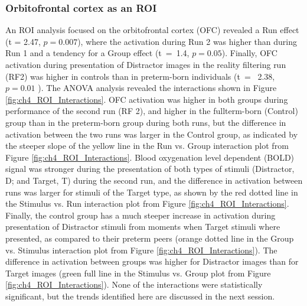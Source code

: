 \vspace{1cm}
\subsubsection{Orbitofrontal cortex as an ROI}
An ROI analysis focused on the orbitofrontal cortex (OFC) revealed a Run effect (t = 2.47, $p = 0.007$), where the activation during Run 2 was higher than during Run 1 and a tendency for a Group effect (t~=~1.4, $p = 0.05$). Finally, OFC activation during presentation of Distractor images in the reality filtering run (RF2) was higher in controls than in preterm-born individuals (t~= ~2.38, $p = 0.01$ ). The ANOVA analysis revealed the interactions shown in Figure \ref{fig:ch4_ROI_Interactions}. OFC activation was higher in both groups during performance of the second run (RF 2), and higher in the fullterm-born (Control) group than in the preterm-born group during both runs, but the difference in activation between the two runs was larger in the Control group, as indicated by the steeper slope of the yellow line in the Run vs. Group interaction plot from Figure \ref{fig:ch4_ROI_Interactions}. Blood oxygenation level dependent (BOLD) signal was stronger during the presentation of both types of stimuli (Distractor, D; and Target, T) during the second run, and the difference in activation between runs was larger for stimuli of the Target type, as shown by the red dotted line in the Stimulus vs. Run interaction plot from Figure \ref{fig:ch4_ROI_Interactions}. Finally, the control group has a much steeper increase in activation during presentation of Distractor stimuli from moments when Target stimuli where presented, as compared to their preterm peers (orange dotted line in the Group vs. Stimulus interaction plot from Figure \ref{fig:ch4_ROI_Interactions}). The difference in activation between groups was higher for Distractor images than for Target images (green full line in the Stimulus vs. Group plot from Figure \ref{fig:ch4_ROI_Interactions}). None of the interactions were statistically significant, but the trends identified here are discussed in the next session.


